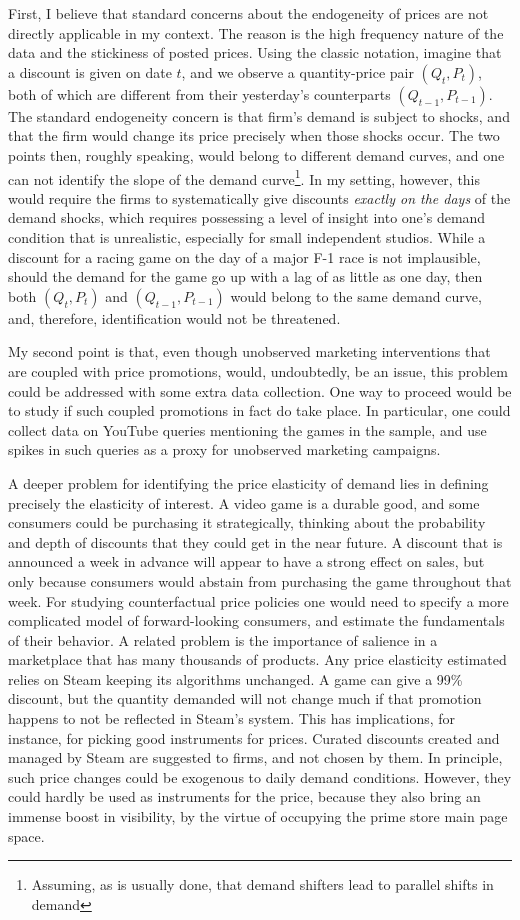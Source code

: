 \documentclass[
  12pt,
  pagebackref]{article}
\begin{document}
First, I believe that standard concerns about the endogeneity of prices
are not directly applicable in my context. The reason is the high
frequency nature of the data and the stickiness of posted prices. Using
the classic notation, imagine that a discount is given on date \(t\),
and we observe a quantity-price pair \((Q_t, P_t)\), both of which are
different from their yesterday's counterparts \((Q_{t-1}, P_{t-1})\).
The standard endogeneity concern is that firm's demand is subject to
shocks, and that the firm would change its price precisely when those
shocks occur. The two points then, roughly speaking, would belong to
different demand curves, and one can not identify the slope of the
demand
curve\footnote{Assuming, as is usually done, that demand shifters lead to parallel shifts in demand}.
In my setting, however, this would require the firms to systematically
give discounts \emph{exactly on the days} of the demand shocks, which
requires possessing a level of insight into one's demand condition that
is unrealistic, especially for small independent studios. While a
discount for a racing game on the day of a major F-1 race is not
implausible, should the demand for the game go up with a lag of as
little as one day, then both \((Q_t, P_t)\) and \((Q_{t-1}, P_{t-1})\)
would belong to the same demand curve, and, therefore, identification
would not be threatened.

My second point is that, even though unobserved marketing interventions
that are coupled with price promotions, would, undoubtedly, be an issue,
this problem could be addressed with some extra data collection. One way
to proceed would be to study if such coupled promotions in fact do take
place. In particular, one could collect data on YouTube queries
mentioning the games in the sample, and use spikes in such queries as a
proxy for unobserved marketing campaigns.

A deeper problem for identifying the price elasticity of demand lies in
defining precisely the elasticity of interest. A video game is a durable
good, and some consumers could be purchasing it strategically, thinking
about the probability and depth of discounts that they could get in the
near future. A discount that is announced a week in advance will appear
to have a strong effect on sales, but only because consumers would
abstain from purchasing the game throughout that week. For studying
counterfactual price policies one would need to specify a more
complicated model of forward-looking consumers, and estimate the
fundamentals of their behavior. A related problem is the importance of
salience in a marketplace that has many thousands of products. Any price
elasticity estimated relies on Steam keeping its algorithms unchanged. A
game can give a 99\% discount, but the quantity demanded will not change
much if that promotion happens to not be reflected in Steam's system.
This has implications, for instance, for picking good instruments for
prices. Curated discounts created and managed by Steam are suggested to
firms, and not chosen by them. In principle, such price changes could be
exogenous to daily demand conditions. However, they could hardly be used
as instruments for the price, because they also bring an immense boost
in visibility, by the virtue of occupying the prime store main page
space.
\end{document}

